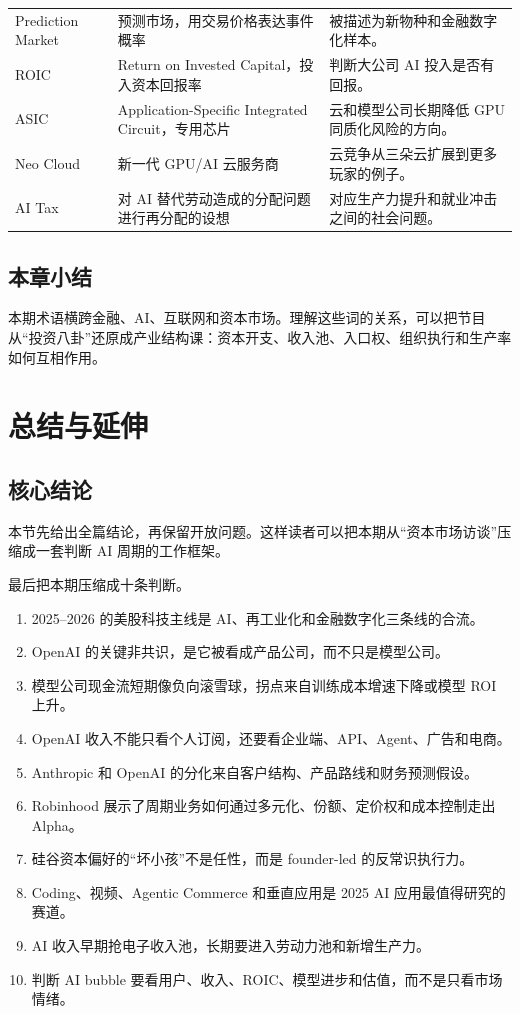 \documentclass[a4paper]{article}
\begin{document}
\begin{longtable}{p{}p{}p{}}
Prediction Market & 预测市场，用交易价格表达事件概率 & 被描述为新物种和金融数字化样本。 \\
ROIC & Return on Invested Capital，投入资本回报率 & 判断大公司 AI 投入是否有回报。 \\
ASIC & Application-Specific Integrated Circuit，专用芯片 & 云和模型公司长期降低 GPU 同质化风险的方向。 \\
Neo Cloud & 新一代 GPU/AI 云服务商 & 云竞争从三朵云扩展到更多玩家的例子。 \\
AI Tax & 对 AI 替代劳动造成的分配问题进行再分配的设想 & 对应生产力提升和就业冲击之间的社会问题。 \\
\bottomrule
\end{longtable}

\subsection{本章小结}

本期术语横跨金融、AI、互联网和资本市场。理解这些词的关系，可以把节目从“投资八卦”还原成产业结构课：资本开支、收入池、入口权、组织执行和生产率如何互相作用。

\section{总结与延伸}

\subsection{核心结论}

本节先给出全篇结论，再保留开放问题。这样读者可以把本期从“资本市场访谈”压缩成一套判断 AI 周期的工作框架。

最后把本期压缩成十条判断。

\begin{enumerate}
\item 2025--2026 的美股科技主线是 AI、再工业化和金融数字化三条线的合流。
\item OpenAI 的关键非共识，是它被看成产品公司，而不只是模型公司。
\item 模型公司现金流短期像负向滚雪球，拐点来自训练成本增速下降或模型 ROI 上升。
\item OpenAI 收入不能只看个人订阅，还要看企业端、API、Agent、广告和电商。
\item Anthropic 和 OpenAI 的分化来自客户结构、产品路线和财务预测假设。
\item Robinhood 展示了周期业务如何通过多元化、份额、定价权和成本控制走出 Alpha。
\item 硅谷资本偏好的“坏小孩”不是任性，而是 founder-led 的反常识执行力。
\item Coding、视频、Agentic Commerce 和垂直应用是 2025 AI 应用最值得研究的赛道。
\item AI 收入早期抢电子收入池，长期要进入劳动力池和新增生产力。
\item 判断 AI bubble 要看用户、收入、ROIC、模型进步和估值，而不是只看市场情绪。
\end{enumerate}
\end{document}
